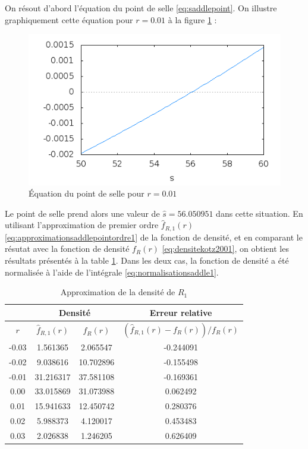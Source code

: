 On résout d'abord l'équation du point de selle
\eqref{eq:saddlepoint}. On illustre graphiquement cette équation pour
$r=0.01$ à la figure \ref{fig:equationptselle0.01R1} :
\begin{figure}[!ht]
  \centering
  \includegraphics[scale=0.5]{./graphiques/pointdeselleGMM.png}
  \caption{Équation du point de selle pour $r=0.01$}
  \label{fig:equationptselle0.01R1}
\end{figure}

Le point de selle prend alors une valeur de $\hat{s}=56.050951$ dans
cette situation. En utilisant l'approximation de premier ordre
$\hat{f}_{R,1}(r)$
\eqref{eq:approximationsaddlepointordre1} %
de la fonction de densité, et en comparant le résutat avec la fonction
de densité ${f}_{R}(r)$ \eqref{eq:densitekotz2001}, on obtient les
résultats présentés à la table \ref{tab:approximationdensiteR1}. Dans
les deux cas, la fonction de densité a été normalisée à l'aide de
l'intégrale \eqref{eq:normalisationsaddle1}.

\begin{table}[ht]
  \centering
  \begin{tabular}{cccc}
    & \multicolumn{2}{c}{\textbf{Densité}} & \multicolumn{1}{c}{\textbf{Erreur relative}} \\
    \hline
    $r$ & $\hat{f}_{R,1}(r)$ & ${f}_{R}(r)$ & $(\hat{f}_{R,1}(r)-{f}_{R}(r))/{{f}_{R}(r)}$ \\ 
    \hline
    -0.03 & 1.561365 & 2.065547 & -0.244091 \\ 
    -0.02 & 9.038616 & 10.702896 & -0.155498 \\ 
    -0.01 & 31.216317 & 37.581108 & -0.169361 \\ 
    0.00 & 33.015869 & 31.073988 & 0.062492 \\ 
    0.01 & 15.941633 & 12.450742 & 0.280376 \\ 
    0.02 & 5.988373 & 4.120017 & 0.453483 \\ 
    0.03 & 2.026838 & 1.246205 & 0.626409 \\ 
    \hline
  \end{tabular}
  \caption{Approximation de la densité de $R_1$}
  \label{tab:approximationdensiteR1}
\end{table}

